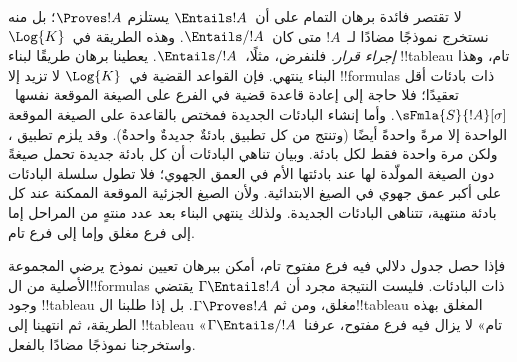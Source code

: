 \documentclass[../../../include/open-logic-section]{subfiles}
\begin{document}
      

\begin{explain}
  لا تقتصر فائدة برهان التمام على أن~$\Entails !A$ يستلزم
  $\Proves !A$؛ بل منه نستخرج نموذجًا مضادًا لـ~$!A$
  متى كان~$\Entails/ !A$. وهذه الطريقة في~$\Log{K}$ \emph{إجراء قرار}.
  فلنفرض، مثلًا،~$\Entails/ !A$. يعطينا برهان
   طريقًا لبناء !!{tableau} تام،
  وهذا البناء ينتهي. فإن القواعد القضية في~$\Log{K}$ لا تزيد إلا
  !!{formula}s ذات بادئات أقل تعقيدًا؛ فلا حاجة إلى إعادة قاعدة
  قضية في الفرع على الصيغة الموقعة نفسها~$\sFmla{S}{!A}[\sigma]$.
  وأما إنشاء البادئات الجديدة فمختص بالقاعدة
  على الصيغة الموقعة الواحدة إلا مرةً واحدةً أيضًا (وتنتج من كل تطبيق
  بادئةٌ جديدةٌ واحدةٌ).
  وقد يلزم تطبيق
  ، ولكن مرة واحدة
  فقط لكل بادئة. وبيان تناهي البادئات أن كل بادئة جديدة تحمل صيغةً دون
  الصيغة المولّدة لها عند بادئتها الأم في العمق الجهوي؛ فلا تطول سلسلة
  البادئات على أكبر عمق جهوي في الصيغ الابتدائية. ولأن الصيغ الجزئية
  الموقعة الممكنة عند كل بادئة منتهية، تتناهى البادئات الجديدة. ولذلك
  ينتهي البناء بعد عدد منتهٍ من المراحل إما إلى فرع مغلق وإما إلى فرع تام.

  فإذا حصل جدول دلالي فيه فرع مفتوح تام، أمكن ببرهان
   تعيين نموذج يرضي المجموعة
  الأصلية من ال!!{formula}s ذات البادئات. فليست النتيجة مجرد أن
  $\Gamma \Entails !A$ يقتضي وجود !!{tableau} مغلق، ومن ثم
  $\Gamma \Proves !A$. بل إذا طلبنا ال!!{tableau} المغلق بهذه
  الطريقة، ثم انتهينا إلى !!{tableau} «تام» لا يزال فيه فرع مفتوح،
  عرفنا~$\Gamma \Entails/ !A$ واستخرجنا نموذجًا مضادًا بالفعل.
\end{explain}
\end{document}
